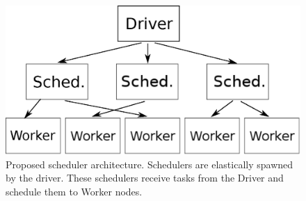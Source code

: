 \begin{figure}[t!]
  \begin{center}
    \includegraphics[scale=0.45]{images_graphs/scheduler_architecture.eps}
  \end{center}
  \caption{Proposed scheduler architecture. Schedulers are elastically spawned by the driver. These schedulers receive tasks from the Driver and schedule them to Worker nodes.}
  \label{fig:schedarch}
\end{figure}

